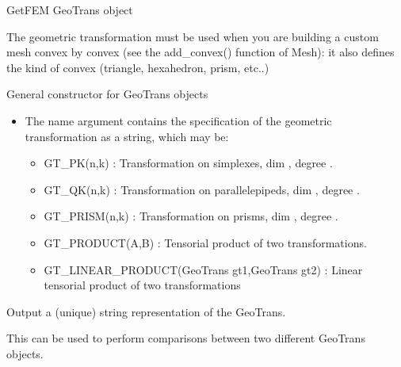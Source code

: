 \documentclass[a4paper,11pt,english]{sphinxmanual}
\begin{document}
\begin{fulllineitems}
\label{\detokenize{python/cmdref_GeoTrans:getfem.GeoTrans}}
GetFEM GeoTrans object

The geometric transformation must be used when you are building a custom
mesh convex by convex (see the add\_convex() function of Mesh): it also
defines the kind of convex (triangle, hexahedron, prism, etc..)

General constructor for GeoTrans objects
\begin{itemize}
\item {} 
The name argument contains the specification of the geometric transformation
as a string, which may be:
\begin{itemize}
\item {} 
GT\_PK(n,k) :
Transformation on simplexes, dim , degree .

\item {} 
GT\_QK(n,k) :
Transformation on parallelepipeds, dim , degree .

\item {} 
GT\_PRISM(n,k) :
Transformation on prisms, dim , degree .

\item {} 
GT\_PRODUCT(A,B) :
Tensorial product of two transformations.

\item {} 
GT\_LINEAR\_PRODUCT(GeoTrans gt1,GeoTrans gt2) :
Linear tensorial product of two transformations

\end{itemize}

\end{itemize}

\begin{fulllineitems}
\label{\detokenize{python/cmdref_GeoTrans:getfem.GeoTrans.char}}
Output a (unique) string representation of the GeoTrans.

This can be used to perform comparisons between two
different GeoTrans objects.

\end{fulllineitems}


\end{fulllineitems}
\end{document}
